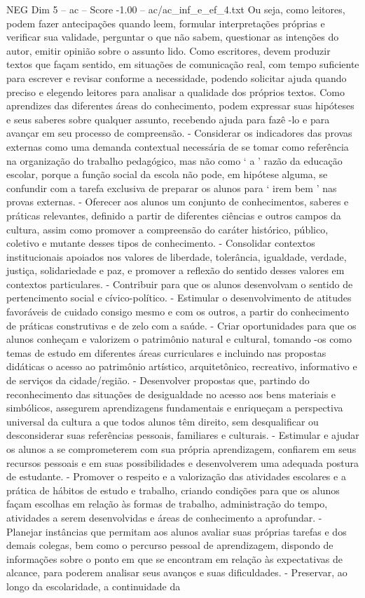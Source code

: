 \begin{textsample}{NEG Dim 5 – ac – Score -1.00 – ac/ac\_inf\_e\_ef\_4.txt}
Ou seja, como leitores, podem fazer antecipações quando leem, formular interpretações próprias e verificar sua validade, perguntar o que não sabem, questionar as intenções do autor, emitir opinião sobre o assunto lido.
Como escritores, devem produzir textos que façam sentido, em situações de comunicação real, com tempo suficiente para escrever e revisar conforme a necessidade, podendo solicitar ajuda quando preciso e elegendo leitores para analisar a qualidade dos próprios textos.
Como aprendizes das diferentes áreas do conhecimento, podem expressar suas hipóteses e seus saberes sobre qualquer assunto, recebendo ajuda para fazê -lo e para avançar em seu processo de compreensão. - Considerar os indicadores das provas externas como uma demanda contextual necessária de se tomar como referência na organização do trabalho pedagógico, mas não como ‘ a ’ razão da educação escolar, porque a função social da escola não pode, em hipótese alguma, se confundir com a tarefa exclusiva de preparar os alunos para ‘ irem bem ’ nas provas externas. - Oferecer aos alunos um conjunto de conhecimentos, saberes e práticas relevantes, definido a partir de diferentes ciências e outros campos da cultura, assim como promover a compreensão do caráter histórico, público, coletivo e mutante desses tipos de conhecimento. - Consolidar contextos institucionais apoiados nos valores de liberdade, tolerância, igualdade, verdade, justiça, solidariedade e paz, e promover a reflexão do sentido desses valores em contextos particulares. - Contribuir para que os alunos desenvolvam o sentido de pertencimento social e cívico-político. - Estimular o desenvolvimento de atitudes favoráveis de cuidado consigo mesmo e com os outros, a partir do conhecimento de práticas construtivas e de zelo com a saúde. - Criar oportunidades para que os alunos conheçam e valorizem o patrimônio natural e cultural, tomando -os como temas de estudo em diferentes áreas curriculares e incluindo nas propostas didáticas o acesso ao patrimônio artístico, arquitetônico, recreativo, informativo e de serviços da cidade/região. - Desenvolver propostas que, partindo do reconhecimento das situações de desigualdade no acesso aos bens materiais e simbólicos, assegurem aprendizagens fundamentais e enriqueçam a perspectiva universal da cultura a que todos alunos têm direito, sem desqualificar ou desconsiderar suas referências pessoais, familiares e culturais. - Estimular e ajudar os alunos a se comprometerem com sua própria aprendizagem, confiarem em seus recursos pessoais e em suas possibilidades e desenvolverem uma adequada postura de estudante. - Promover o respeito e a valorização das atividades escolares e a prática de hábitos de estudo e trabalho, criando condições para que os alunos façam escolhas em relação às formas de trabalho, administração do tempo, atividades a serem desenvolvidas e áreas de conhecimento a aprofundar. - Planejar instâncias que permitam aos alunos avaliar suas próprias tarefas e dos demais colegas, bem como o percurso pessoal de aprendizagem, dispondo de informações sobre o ponto em que se encontram em relação às expectativas de alcance, para poderem analisar seus avanços e suas dificuldades. - Preservar, ao longo da escolaridade, a continuidade da 
\end{textsample}
